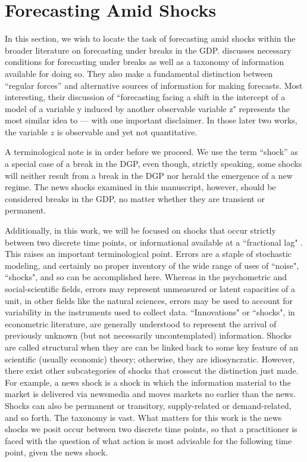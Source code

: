 \documentclass[11pt]{article}
\theoremstyle{definition}
\begin{document}
 \section{Forecasting Amid Shocks}

 In this section, we wish to locate the task of forecasting amid shocks within the broader literature on forecasting under breaks in the GDP.  \cite{castle2011forecasting} discusses necessary conditions for forecasting under breaks as well as a taxonomy of information available for doing so.  They also make a fundamental distinction between ``regular forces'' and alternative sources of information for making forecasts.  Most interesting, their discussion of ``forecasting facing a shift in the intercept of a model of a variable y induced by another observable variable z" represents the most similar idea to  \cite{lin2021minimizing,lundquist2024volatility} --- with one important disclaimer.  In those later two works, the variable $z$ is observable and yet not quantitative.

 A terminological note is in order before we proceed.  We use the term ``shock'' as a special case of a break in the DGP, even though, strictly speaking, some shocks will neither result from a break in the DGP nor herald the emergence of a new regime.  The news shocks examined in this manuscript, however, should be considered breaks in the GDP, no matter whether they are transient or permanent.  

Additionally, in this work, we will be focused on shocks that occur strictly between two discrete time points, or informational available at a ``fractional lag" \citep{castle2011forecasting}.  This raises an important terminological point.  Errors are a staple of stochastic modeling, and certainly no proper inventory of the wide range of uses of ``noise", ``shocks", and so can be accomplished here.  Whereas in the psychometric and social-scientific fields, errors may represent unmeasured or latent capacities of a unit, in other fields like the natural sciences, errors may be used to account for variability in the instruments used to collect data.  ``Innovations" or ``shocks", in econometric literature, are generally understood to represent the arrival of previously unknown (but not necessarily uncontemplated) information.  Shocks are called structural when they are can be linked back to some key feature of an scientific (usually economic) theory; otherwise, they are idiosyncratic.  However, there exist other subcategories of shocks that crosscut the distinction just made.  For example, a news shock is a shock in which the information material to the market is delivered via newsmedia and moves markets no earlier than the news.  Shocks can also be permanent or transitory, supply-related or demand-related, and so forth.  The taxonomy is vast.  What matters for this work is the news shocks we posit occur between two discrete time points, so that a practitioner is faced with the question of what action is most advisable for the following time point, given the news shock.
\end{document}

